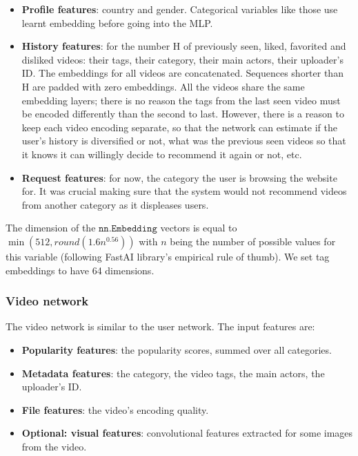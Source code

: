 \begin{itemize}
    \item \textbf{Profile features}: country and gender. Categorical variables like those use learnt embedding before going into the \ac{MLP}.
    \item \textbf{History features}: for the number H of previously seen, liked, favorited and disliked videos: their tags, their category, their main actors, their uploader's ID. The embeddings for all videos are concatenated. Sequences shorter than H are padded with zero embeddings. All the videos share the same embedding layers; there is no reason the tags from the last seen video must be encoded differently than the second to last. However, there is a reason to keep each video encoding separate, so that the network can estimate if the user's history is diversified or not, what was the previous seen videos so that it knows it can willingly decide to recommend it again or not, etc. 
    \item \textbf{Request features}: for now, the category the user is browsing the website for. It was crucial making sure that the system would not recommend videos from another category as it displeases users. 
\end{itemize}

The dimension of the $\texttt{nn.Embedding}$ vectors is equal to $\min(512, round(1.6n^{0.56}))$ with $n$ being the number of possible values for this variable (following FastAI library's empirical rule of thumb). We set tag embeddings to have 64 dimensions.

\subsubsection{Video network}

The video network is similar to the user network. The input features are:

\begin{itemize}
    \item \textbf{Popularity features}: the popularity scores, summed over all categories.
    \item \textbf{Metadata features}: the category, the video tags, the main actors, the uploader's ID.
    \item \textbf{File features}: the video's encoding quality.
    \item \textbf{Optional: visual features}: convolutional features extracted for some images from the video.
\end{itemize}

